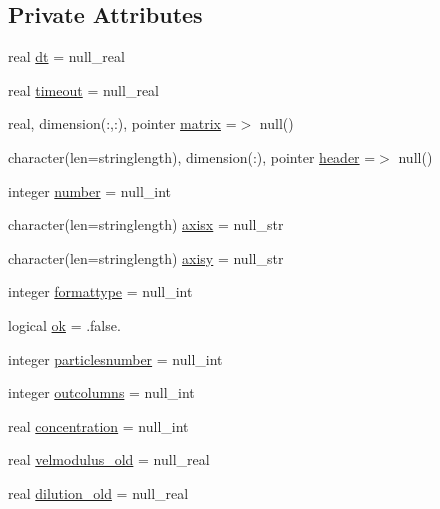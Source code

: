 \subsection*{Private Attributes}
\begin{DoxyCompactItemize}
\item 
real \mbox{\hyperlink{structmodulejet_1_1t__output_a7252b53065797d97cbfafc54bae0a31d}{dt}} = null\+\_\+real
\item 
real \mbox{\hyperlink{structmodulejet_1_1t__output_acfd75fa6261e48108fe29576b1745deb}{timeout}} = null\+\_\+real
\item 
real, dimension(\+:,\+:), pointer \mbox{\hyperlink{structmodulejet_1_1t__output_a1c9bc10435a062081bbb6bd5c94089f0}{matrix}} =$>$ null()
\item 
character(len=stringlength), dimension(\+:), pointer \mbox{\hyperlink{structmodulejet_1_1t__output_aa124ad1512db41a2e021803b8d39ecec}{header}} =$>$ null()
\item 
integer \mbox{\hyperlink{structmodulejet_1_1t__output_a4bec3397b291c64a356ca674d8615d11}{number}} = null\+\_\+int
\item 
character(len=stringlength) \mbox{\hyperlink{structmodulejet_1_1t__output_a1faed64c683b71938b84f590ef846d67}{axisx}} = null\+\_\+str
\item 
character(len=stringlength) \mbox{\hyperlink{structmodulejet_1_1t__output_a37eb35fb661012d8c826b74e52ca2d6c}{axisy}} = null\+\_\+str
\item 
integer \mbox{\hyperlink{structmodulejet_1_1t__output_abe6961651f4ab566516468b42adaf26e}{formattype}} = null\+\_\+int
\item 
logical \mbox{\hyperlink{structmodulejet_1_1t__output_a9a8308a4407478b93e7b927fe47ecf6d}{ok}} = .false.
\item 
integer \mbox{\hyperlink{structmodulejet_1_1t__output_a146284992a8847ebe8805fd5936116dd}{particlesnumber}} = null\+\_\+int
\item 
integer \mbox{\hyperlink{structmodulejet_1_1t__output_a336afd086ef533cbaa5f11130e0791e1}{outcolumns}} = null\+\_\+int
\item 
real \mbox{\hyperlink{structmodulejet_1_1t__output_ac2db3a6afbe8dda7373b2e50f65a0e40}{concentration}} = null\+\_\+int
\item 
real \mbox{\hyperlink{structmodulejet_1_1t__output_a8de239a413a28bab65ea856b04499c9d}{velmodulus\+\_\+old}} = null\+\_\+real
\item 
real \mbox{\hyperlink{structmodulejet_1_1t__output_a518707bee5b971d161a6b75d31d498d0}{dilution\+\_\+old}} = null\+\_\+real

\end{DoxyCompactItemize}
